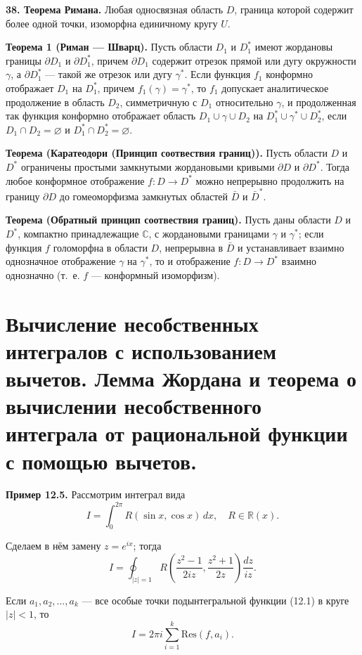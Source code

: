 \documentclass[12pt, a4paper]{article}
\theoremstyle{definition}
\theoremstyle{remark}
\begin{document}
\textbf{38. Теорема Римана.} Любая односвязная область $D$, граница которой содержит более одной точки, изоморфна единичному кругу $U$.

\textbf{Теорема 1 (Риман --- Шварц).} Пусть области $D_1$ и $D_1^*$ имеют жордановы границы $\partial D_1$ и $\partial D_1^*$, причем $\partial D_1$ содержит отрезок прямой или дугу окружности $\gamma$, а $\partial D_1^*$ --- такой же отрезок или дугу $\gamma^*$. Если функция $f_1$ конформно отображает $D_1$ на $D_1^*$, причем $f_1(\gamma) = \gamma^*$, то $f_1$ допускает аналитическое продолжение в область $D_2$, симметричную с $D_1$ относительно $\gamma$, и продолженная так функция конформно отображает область $D_1 \cup \gamma \cup D_2$ на $D_1^* \cup \gamma^* \cup D_2^*$, если $D_1 \cap D_2 = \varnothing$ и $D_1^* \cap D_2^* = \varnothing$.

\textbf{Теорема (Каратеодори (Принцип соотвествия границ)).} Пусть области $D$ и $D^*$ ограничены простыми замкнутыми жордановыми кривыми $\partial D$ и $\partial D^*$. Тогда любое конформное отображение $f: D \to D^*$ можно непрерывно продолжить на границу $\partial D$ до гомеоморфизма замкнутых областей $\bar{D}$ и $\bar{D}^*$.

\textbf{Теорема (Обратный принцип соотвествия границ).} Пусть даны области $D$ и $D^*$, компактно принадлежащие $\mathbb{C}$, с жордановыми границами $\gamma$ и $\gamma^*$; если функция $f$ голоморфна в области $D$, непрерывна в $\bar{D}$ и устанавливает взаимно однозначное отображение $\gamma$ на $\gamma^*$, то и отображение $f: D \to D^*$ взаимно однозначно (т.~е. $f$ --- конформный изоморфизм).

\newpage
\section{Вычисление несобственных интегралов с использованием вычетов. Лемма Жордана и теорема о вычислении несобственного интеграла от рациональной функции с помощью вычетов.}

\textbf{Пример 12.5.} Рассмотрим интеграл вида
$$I = \int_{0}^{2\pi} R(\sin x, \cos x) \, dx, \quad R \in \mathbb{R}(x).$$

Сделаем в нём замену $z = e^{ix}$; тогда
\begin{equation}
	I = \oint_{|z|=1} R\left( \frac{z^2 - 1}{2iz}, \frac{z^2 + 1}{2z} \right) \frac{dz}{iz}.
\end{equation}

Если $a_1, a_2, \ldots, a_k$ --- все особые точки подынтегральной функции (12.1) в круге $|z| < 1$, то
$$I = 2\pi i \sum_{i=1}^{k} \text{Res}(f, a_i).$$
\end{document}
